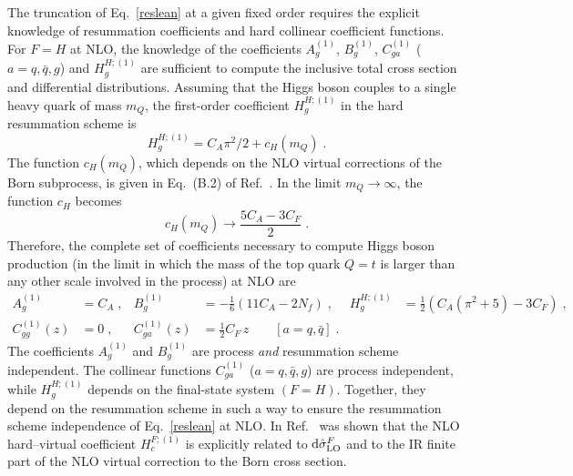 \documentclass[12pt]{article}
\DeclareRobustCommand{\nn}{\nonumber}
\DeclareRobustCommand{\rd}{\ensuremath{\mathrm{d}}}
\begin{document}
\begin{appendix}
The truncation of Eq.~\eqref{reslean} at a given fixed order requires the explicit knowledge of resummation coefficients and hard collinear coefficient functions.
For $F=H$ at NLO, the knowledge of the coefficients $A^{(1)}_{g}$, $B^{(1)}_{g}$, $C^{(1)}_{ga}$ ($a=q,{\bar q},g$) and $H^{H;(1)}_{g}$ are sufficient to compute the inclusive total cross section and differential distributions. Assuming that the Higgs boson couples to a single heavy quark of mass $m_Q$, the first-order coefficient $H_g^{H;(1)}$ in the hard resummation scheme is~\cite{Catani:2013tia}
\begin{equation}
  H_g^{H;(1)} = C_A\pi^2/2+c_H(m_Q) \;.
  \label{H1g}
\end{equation}
The function $c_H(m_Q)$, which depends on the NLO virtual corrections of the Born subprocess, is given in Eq.~(B.2) of Ref.~\cite{Spira:1995rr}. In the limit $m_Q\to \infty$, the function $c_H$ becomes
\begin{equation}
  c_H(m_Q)\longrightarrow\frac{5C_A-3C_F}{2} \;.
\end{equation}
Therefore, the complete set of coefficients necessary to compute Higgs boson production (in the limit in which the mass of the top quark $Q=t$ is larger than any other scale involved in the process) at NLO are
\begin{align}
  A^{(1)}_{g} &= C_{A}\;, &
  B^{(1)}_{g} &= -\frac{1}{6} \left( 11 C_A - 2 N_f \right)\;, &
  H^{H;(1)}_{g} &= \frac{1}{2}(C_{A}(\pi^{2}+5)-3 C_{F})\;,
  \nn\\
  C^{(1)}_{gg}(z) &= 0 \;, &
  C^{(1)}_{ga}(z) &= \frac{1}{2}C_F\,z \qquad\left[a=q,{\bar q}\right] \;.
  \label{eq:nloconstants}
\end{align}
The coefficients $A^{(1)}_{g}$ and $B^{(1)}_{g}$ are process \emph{and} resummation scheme independent. The collinear functions $C^{(1)}_{ga}$ ($a=q,{\bar q},g$) are process independent, while $H^{H;(1)}_{g}$ depends on the final-state system $(F=H)$. Together,  they depend on the resummation scheme in such a way to ensure the resummation scheme independence of Eq.~\eqref{reslean} at NLO. In Ref.~\cite{deFlorian:2001zd} was shown that the NLO hard--virtual coefficient $H^{F;(1)}_{c}$ is explicitly related to $\rd\hat{\sigma}^{F}_{\rm LO}$ and to the IR finite part of the NLO virtual correction to the Born cross section. 


\end{appendix}
\end{document}
